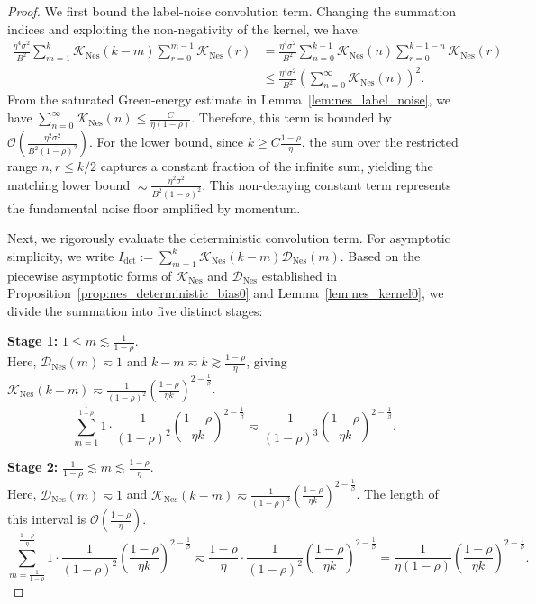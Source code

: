 \begin{proof}
We first bound the label-noise convolution term. Changing the summation indices and exploiting the non-negativity of the kernel, we have:
\begin{align*}
    \frac{\eta^4\sigma^2}{B^2}\sum_{m=1}^{k}\mathcal K_{\mathrm{Nes}}(k-m)\sum_{r=0}^{m-1}\mathcal K_{\mathrm{Nes}}(r)
    &= \frac{\eta^4\sigma^2}{B^2} \sum_{n=0}^{k-1} \mathcal K_{\mathrm{Nes}}(n) \sum_{r=0}^{k-1-n} \mathcal K_{\mathrm{Nes}}(r) \\
    &\le \frac{\eta^4\sigma^2}{B^2} \left( \sum_{n=0}^{\infty} \mathcal K_{\mathrm{Nes}}(n) \right)^2.
\end{align*}
From the saturated Green-energy estimate in Lemma~\ref{lem:nes_label_noise}, we have $\sum_{n=0}^{\infty} \mathcal K_{\mathrm{Nes}}(n) \le \frac{C}{\eta(1-\rho)}$. Therefore, this term is bounded by $\mathcal{O}\left( \frac{\eta^2\sigma^2}{B^2(1-\rho)^2} \right)$. For the lower bound, since $k \ge C\frac{1-\rho}{\eta}$, the sum over the restricted range $n, r \le k/2$ captures a constant fraction of the infinite sum, yielding the matching lower bound $\eqsim \frac{\eta^2\sigma^2}{B^2(1-\rho)^2}$. This non-decaying constant term represents the fundamental noise floor amplified by momentum.

Next, we rigorously evaluate the deterministic convolution term. For asymptotic simplicity, we write $I_{\mathrm{det}} := \sum_{m=1}^{k} \mathcal K_{\mathrm{Nes}}(k-m)\mathcal D_{\mathrm{Nes}}(m)$. Based on the piecewise asymptotic forms of $\mathcal K_{\mathrm{Nes}}$ and $\mathcal D_{\mathrm{Nes}}$ established in Proposition~\ref{prop:nes_deterministic_bias0} and Lemma~\ref{lem:nes_kernel0}, we divide the summation into five distinct stages:

\textbf{Stage 1:} $1 \le m \lesssim \frac{1}{1-\rho}$. \\
Here, $\mathcal D_{\mathrm{Nes}}(m) \eqsim 1$ and $k-m \eqsim k \gtrsim \frac{1-\rho}{\eta}$, giving $\mathcal K_{\mathrm{Nes}}(k-m) \eqsim \frac{1}{(1-\rho)^2} \left(\frac{1-\rho}{\eta k}\right)^{2-\frac1\beta}$.
\[
    \sum_{m=1}^{\frac{1}{1-\rho}} 1 \cdot \frac{1}{(1-\rho)^2} \left(\frac{1-\rho}{\eta k}\right)^{2-\frac1\beta} \eqsim \frac{1}{(1-\rho)^3} \left(\frac{1-\rho}{\eta k}\right)^{2-\frac1\beta}.
\]

\textbf{Stage 2:} $\frac{1}{1-\rho} \lesssim m \lesssim \frac{1-\rho}{\eta}$. \\
Here, $\mathcal D_{\mathrm{Nes}}(m) \eqsim 1$ and $\mathcal K_{\mathrm{Nes}}(k-m) \eqsim \frac{1}{(1-\rho)^2} \left(\frac{1-\rho}{\eta k}\right)^{2-\frac1\beta}$. The length of this interval is $\mathcal{O}(\frac{1-\rho}{\eta})$.
\[
    \sum_{m=\frac{1}{1-\rho}}^{\frac{1-\rho}{\eta}} 1 \cdot \frac{1}{(1-\rho)^2} \left(\frac{1-\rho}{\eta k}\right)^{2-\frac1\beta} \eqsim \frac{1-\rho}{\eta} \cdot \frac{1}{(1-\rho)^2} \left(\frac{1-\rho}{\eta k}\right)^{2-\frac1\beta} = \frac{1}{\eta(1-\rho)} \left(\frac{1-\rho}{\eta k}\right)^{2-\frac1\beta}.
\]


\end{proof}
